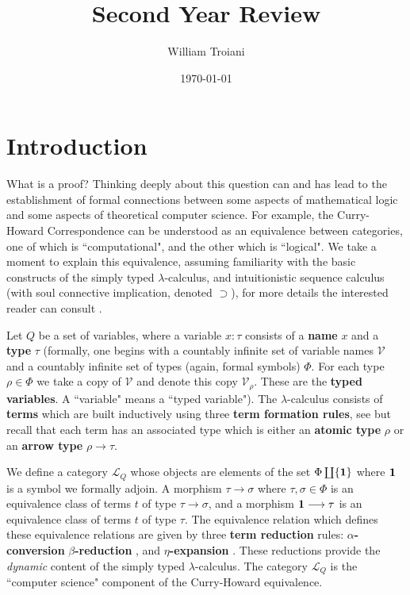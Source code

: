 \documentclass[12pt]{article}
\title{Second Year Review}
\author{William Troiani}
\date{\today}
\theoremstyle{plain}
\theoremstyle{definition}
\newcommand{\call}[1]{\mathcal{#1}}
\newcommand{\lto}{\longrightarrow}
\begin{document}
	\maketitle
	\section{Introduction}
	
	What is a proof? Thinking deeply about this question can and has lead to the establishment of formal connections between some aspects of mathematical logic and some aspects of theoretical computer science. For example, the Curry-Howard Correspondence can be understood as an equivalence between categories, one of which is ``computational", and the other which is ``logical". We take a moment to explain this equivalence, assuming familiarity with the basic constructs of the simply typed $\lambda$-calculus, and intuitionistic sequence calculus (with soul connective implication, denoted $\supset$), for more details the interested reader can consult \cite{GMZ}.
	
	Let $Q$ be a set of variables, where a variable $x: \tau$ consists of a \textbf{name} $x$ and a \textbf{type} $\tau$ (formally, one begins with a countably infinite set of variable names $\call{V}$ and a countably infinite set of types (again, formal symbols) $\Phi$. For each type $\rho \in \Phi$ we take a copy of $\call{V}$ and denote this copy $\call{V}_\rho$. These are the \textbf{typed variables}. A ``variable" means a ``typed variable"). The $\lambda$-calculus consists of \textbf{terms} which are built inductively using three \textbf{term formation rules}, see \cite[Appendix A]{GMZ} but recall that each term has an associated type which is either an \textbf{atomic type} $\rho$ or an \textbf{arrow type} $\rho \lto \tau$.
	
	We define a category $\call{L}_Q$ whose objects are elements of the set $\Phi \coprod \{ \bold{1} \}$ where $\bold{1}$ is a symbol we formally adjoin. A morphism $\tau \lto \sigma$ where $\tau, \sigma \in \Phi$ is an equivalence class of terms $t$ of type $\tau \lto \sigma$, and a morphism $\bold{1} \lto \tau$ is an equivalence class of terms $t$ of type $\tau$. The equivalence relation which defines these equivalence relations are given by three \textbf{term reduction} rules: \textbf{$\alpha$-conversion} \cite[Appendix A, page 62]{GMZ} \textbf{$\beta$-reduction} \cite[Definition 1.3.2]{SorUrz}, and \textbf{$\eta$-expansion} \cite[Definition 1.3.9]{SorUrz}. These reductions provide the \emph{dynamic} content of the simply typed $\lambda$-calculus. The category $\call{L}_Q$ is the ``computer science" component of the Curry-Howard equivalence.
	
\end{document}
